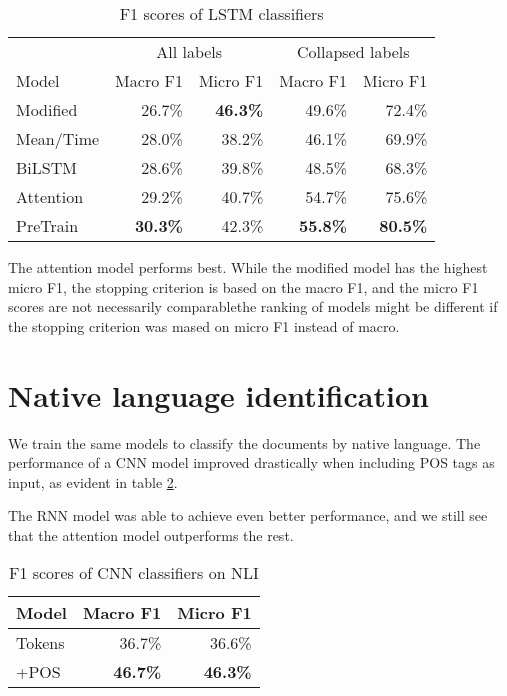 \begin{table}
  \centering
  \begin{tabular}{|l|rr|rr|}
    \toprule
            & \multicolumn{2}{c|}{All labels} & \multicolumn{2}{c|}{Collapsed labels} \\
    Model     & Macro F1        & Micro F1        & Macro F1        & Micro F1        \\
    \midrule
    Modified  &         26.7\%  & \textbf{46.3\%} &         49.6\%  &         72.4\%  \\
    Mean/Time &         28.0\%  &         38.2\%  &         46.1\%  &         69.9\%  \\
    BiLSTM    &         28.6\%  &         39.8\%  &         48.5\%  &         68.3\%  \\
    Attention &         29.2\%  &         40.7\%  &         54.7\%  &         75.6\%  \\
    PreTrain  & \textbf{30.3\%} &         42.3\%  & \textbf{55.8\%} & \textbf{80.5\%} \\
    \bottomrule
  \end{tabular}
  \caption{F1 scores of LSTM classifiers}
  \label{lstm-results}
\end{table}

The attention model performs best. While the modified model has the highest
micro F1, the stopping criterion is based on the macro F1, and the micro F1
scores are not necessarily comparable\textemdash the ranking of models might
be different if the stopping criterion was mased on micro F1 instead of
macro.



\section{Native language identification}

We train the same models to classify the documents by native language. The
performance of a \ac{CNN} model improved drastically when including \ac{POS}
tags as input, as evident in table \ref{cnn-nli-results}.

The \ac{RNN} model was able to achieve even better performance, and we still
see that the attention model outperforms the rest.

\begin{table}
  \centering
  \begin{tabular}{|l|rr|}
    \toprule
    Model     & Macro F1        & Micro F1        \\
    \midrule
    Tokens    &         36.7\%  &         36.6\%  \\
    +POS      & \textbf{46.7\%} & \textbf{46.3\%} \\
    \bottomrule
  \end{tabular}
  \caption{F1 scores of CNN classifiers on NLI}
  \label{cnn-nli-results}
\end{table}

